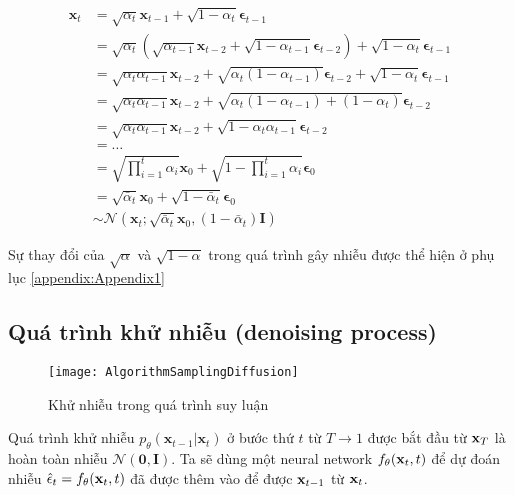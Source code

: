 \begin{equation}
\begin{aligned}
	\boldsymbol{x}_t &= \sqrt{\alpha_t}\boldsymbol{x}_{t-1} + \sqrt{1 - \alpha_t}\boldsymbol{\epsilon}_{t-1} \\
	&= \sqrt{\alpha_t}\left(\sqrt{\alpha_{t-1}}\boldsymbol{x}_{t-2} + \sqrt{1 - \alpha_{t-1}}\boldsymbol{\epsilon}_{t-2}\right) + \sqrt{1 - \alpha_t}\boldsymbol{\epsilon}_{t-1} \\
	&= \sqrt{\alpha_t\alpha_{t-1}}\boldsymbol{x}_{t-2} + \sqrt{\alpha_t(1 - \alpha_{t-1})}\boldsymbol{\epsilon}_{t-2} + \sqrt{1 - \alpha_t}\boldsymbol{\epsilon}_{t-1} \\
	&= \sqrt{\alpha_t\alpha_{t-1}}\boldsymbol{x}_{t-2} + \sqrt{\alpha_t(1 - \alpha_{t-1}) + (1 - \alpha_t)}\boldsymbol{\epsilon}_{t-2} \\
	&= \sqrt{\alpha_t\alpha_{t-1}}\boldsymbol{x}_{t-2} + \sqrt{1 - \alpha_t\alpha_{t-1}}\boldsymbol{\epsilon}_{t-2} \\
	&= \ldots \\
	&= \sqrt{\prod_{i=1}^t \alpha_i} \boldsymbol{x}_0 + \sqrt{1 - \prod_{i=1}^t \alpha_i} \boldsymbol{\epsilon}_0 \\
	&= \sqrt{\bar{\alpha}_t} \boldsymbol{x}_0 + \sqrt{1 - \bar{\alpha}_t} \boldsymbol{\epsilon}_0 \\
	&\sim \mathcal{N}\left(\boldsymbol{x}_t; \sqrt{\bar{\alpha}_t} \boldsymbol{x}_0, \left(1 - \bar{\alpha}_t\right) \textbf{I}\right)
\end{aligned}
\label{eq:tracexzero}
\end{equation}

Sự thay đổi của $\sqrt{\alpha}$ và  $\sqrt{1- \alpha}$ trong quá trình gây nhiễu được thể hiện ở phụ lục \autoref{appendix:Appendix1}

\subsection{Quá trình khử nhiễu (denoising process)}
\label{subsection:denoising_process}

\begin{figure}[H]
	\centering
	\texttt{[image: AlgorithmSamplingDiffusion]}
	\caption{Khử nhiễu trong quá trình suy luận}
	\label{fig:AlgorithmSamplingDiffusion}
	\vspace{-5pt}
\end{figure}

Quá trình khử nhiễu $p_\theta(\mathbf{x}_{t-1} \vert \mathbf{x}_t)$  ở bước thứ $t$ từ $T \to 1$ được bắt đầu từ $\mathbf{x}_T$ là hoàn toàn nhiễu $\mathcal{N} (\mathbf{0}, \mathbf{I})$. Ta sẽ dùng một neural network $f_{\theta} (\mathbf{x}_t, t)$ để dự đoán nhiễu $\hat{\epsilon}_t = f_{\theta}(\mathbf{x}_t, t)$ đã được thêm vào để được $\mathbf{x}_{t-1}$ từ $\mathbf{x}_t$.


